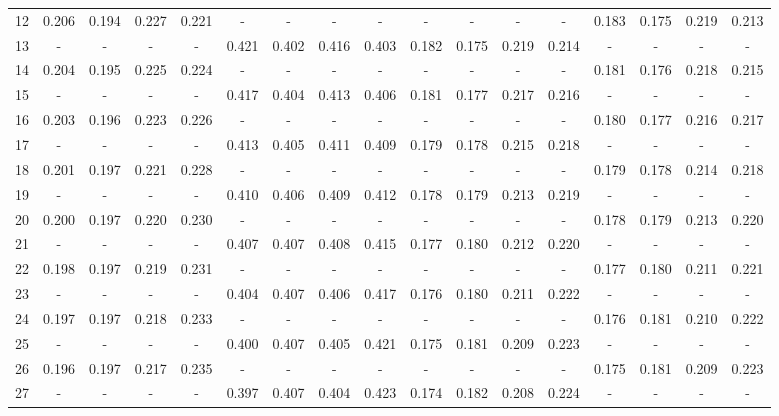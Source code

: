 \documentclass{report}
\begin{document}
\begin{appendices}
\begin{table}
\begin{tabular}{|c|cccc|cccc|cccc|cccc|}
12 & 0.206 & 0.194 & 0.227 & 0.221 &   -   &   -   &   -   &   -   &   -   &   -   &   -   &   -   & 0.183 & 0.175 & 0.219 & 0.213\\
13 &   -   &   -   &   -   &   -   & 0.421 & 0.402 & 0.416 & 0.403 & 0.182 & 0.175 & 0.219 & 0.214 &   -   &   -   &   -   &   -  \\
14 & 0.204 & 0.195 & 0.225 & 0.224 &   -   &   -   &   -   &   -   &   -   &   -   &   -   &   -   & 0.181 & 0.176 & 0.218 & 0.215\\
15 &   -   &   -   &   -   &   -   & 0.417 & 0.404 & 0.413 & 0.406 & 0.181 & 0.177 & 0.217 & 0.216 &   -   &   -   &   -   &   -  \\
16 & 0.203 & 0.196 & 0.223 & 0.226 &   -   &   -   &   -   &   -   &   -   &   -   &   -   &   -   & 0.180 & 0.177 & 0.216 & 0.217\\
17 &   -   &   -   &   -   &   -   & 0.413 & 0.405 & 0.411 & 0.409 & 0.179 & 0.178 & 0.215 & 0.218 &   -   &   -   &   -   &   -  \\
18 & 0.201 & 0.197 & 0.221 & 0.228 &   -   &   -   &   -   &   -   &   -   &   -   &   -   &   -   & 0.179 & 0.178 & 0.214 & 0.218\\
19 &   -   &   -   &   -   &   -   & 0.410 & 0.406 & 0.409 & 0.412 & 0.178 & 0.179 & 0.213 & 0.219 &   -   &   -   &   -   &   -  \\
20 & 0.200 & 0.197 & 0.220 & 0.230 &   -   &   -   &   -   &   -   &   -   &   -   &   -   &   -   & 0.178 & 0.179 & 0.213 & 0.220\\
21 &   -   &   -   &   -   &   -   & 0.407 & 0.407 & 0.408 & 0.415 & 0.177 & 0.180 & 0.212 & 0.220 &   -   &   -   &   -   &   -  \\
22 & 0.198 & 0.197 & 0.219 & 0.231 &   -   &   -   &   -   &   -   &   -   &   -   &   -   &   -   & 0.177 & 0.180 & 0.211 & 0.221\\
23 &   -   &   -   &   -   &   -   & 0.404 & 0.407 & 0.406 & 0.417 & 0.176 & 0.180 & 0.211 & 0.222 &   -   &   -   &   -   &   -  \\
24 & 0.197 & 0.197 & 0.218 & 0.233 &   -   &   -   &   -   &   -   &   -   &   -   &   -   &   -   & 0.176 & 0.181 & 0.210 & 0.222\\
25 &   -   &   -   &   -   &   -   & 0.400 & 0.407 & 0.405 & 0.421 & 0.175 & 0.181 & 0.209 & 0.223 &   -   &   -   &   -   &   -  \\
26 & 0.196 & 0.197 & 0.217 & 0.235 &   -   &   -   &   -   &   -   &   -   &   -   &   -   &   -   & 0.175 & 0.181 & 0.209 & 0.223\\
27 &   -   &   -   &   -   &   -   & 0.397 & 0.407 & 0.404 & 0.423 & 0.174 & 0.182 & 0.208 & 0.224 &   -   &   -   &   -   &   -  \\

\end{tabular}
\end{table}
\end{appendices}
\end{document}
